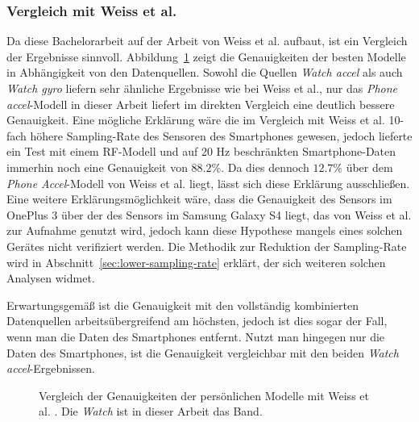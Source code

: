 \subsubsection{Vergleich mit Weiss et al.}
Da diese Bachelorarbeit auf der Arbeit von Weiss et al. \cite{Weiss2016} aufbaut, ist ein Vergleich der Ergebnisse sinnvoll. Abbildung~\ref{fig:accuracy-personal-vs-weiss} zeigt die Genauigkeiten der besten Modelle in Abhängigkeit von den Datenquellen. Sowohl die Quellen \textit{Watch accel} als auch \textit{Watch gyro} liefern sehr ähnliche Ergebnisse wie bei Weiss et al., nur das \textit{Phone accel}-Modell in dieser Arbeit liefert im direkten Vergleich eine deutlich bessere Genauigkeit. Eine mögliche Erklärung wäre die im Vergleich mit Weiss et al. 10-fach höhere Sampling-Rate des Sensoren des Smartphones gewesen, jedoch lieferte ein Test mit einem RF-Modell und auf 20 Hz beschränkten Smartphone-Daten immerhin noch eine Genauigkeit von $88.2 \%$. Da dies dennoch $12.7 \%$ über dem \textit{Phone Accel}-Modell von Weiss et al. liegt, lässt sich diese Erklärung ausschließen. Eine weitere Erklärungsmöglichkeit wäre, dass die Genauigkeit des Sensors im OnePlus 3 über der des Sensors im Samsung Galaxy S4 liegt, das von Weiss et al. zur Aufnahme genutzt wird, jedoch kann diese Hypothese mangels eines solchen Gerätes nicht verifiziert werden. Die Methodik zur Reduktion der Sampling-Rate wird in Abschnitt~\ref{sec:lower-sampling-rate} erklärt, der sich weiteren solchen Analysen widmet.

Erwartungsgemäß ist die Genauigkeit mit den vollständig kombinierten Datenquellen arbeitsübergreifend am höchsten, jedoch ist dies sogar der Fall, wenn man die Daten des Smartphones entfernt. Nutzt man hingegen nur die Daten des Smartphones, ist die Genauigkeit vergleichbar mit den beiden \textit{Watch accel}-Ergebnissen.

\begin{figure}
\centering
{}
\caption[Vergleich der Genauigkeiten der persönlichen Modelle mit Weiss et al. \cite{Weiss2016}]{Vergleich der Genauigkeiten der persönlichen Modelle mit Weiss et al. \cite{Weiss2016}. Die \textit{Watch} ist in dieser Arbeit das Band.}
\label{fig:accuracy-personal-vs-weiss}
\end{figure}

